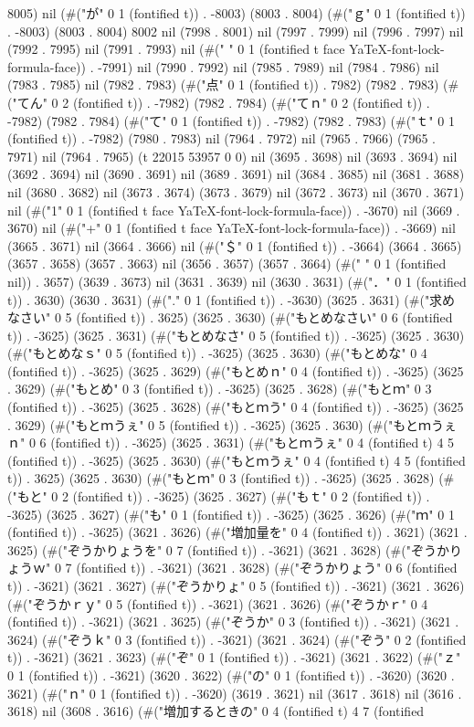 8005) nil (#("が" 0 1 (fontified t)) . -8003) (8003 . 8004) (#("ｇ" 0 1 (fontified t)) . -8003) (8003 . 8004) 8002 nil (7998 . 8001) nil (7997 . 7999) nil (7996 . 7997) nil (7992 . 7995) nil (7991 . 7993) nil (#(" " 0 1 (fontified t face YaTeX-font-lock-formula-face)) . -7991) nil (7990 . 7992) nil (7985 . 7989) nil (7984 . 7986) nil (7983 . 7985) nil (7982 . 7983) (#("点" 0 1 (fontified t)) . 7982) (7982 . 7983) (#("てん" 0 2 (fontified t)) . -7982) (7982 . 7984) (#("てｎ" 0 2 (fontified t)) . -7982) (7982 . 7984) (#("て" 0 1 (fontified t)) . -7982) (7982 . 7983) (#("ｔ" 0 1 (fontified t)) . -7982) (7980 . 7983) nil (7964 . 7972) nil (7965 . 7966) (7965 . 7971) nil (7964 . 7965) (t 22015 53957 0 0) nil (3695 . 3698) nil (3693 . 3694) nil (3692 . 3694) nil (3690 . 3691) nil (3689 . 3691) nil (3684 . 3685) nil (3681 . 3688) nil (3680 . 3682) nil (3673 . 3674) (3673 . 3679) nil (3672 . 3673) nil (3670 . 3671) nil (#("1" 0 1 (fontified t face YaTeX-font-lock-formula-face)) . -3670) nil (3669 . 3670) nil (#("+" 0 1 (fontified t face YaTeX-font-lock-formula-face)) . -3669) nil (3665 . 3671) nil (3664 . 3666) nil (#("＄" 0 1 (fontified t)) . -3664) (3664 . 3665) (3657 . 3658) (3657 . 3663) nil (3656 . 3657) (3657 . 3664) (#("	" 0 1 (fontified nil)) . 3657) (3639 . 3673) nil (3631 . 3639) nil (3630 . 3631) (#("．" 0 1 (fontified t)) . 3630) (3630 . 3631) (#("." 0 1 (fontified t)) . -3630) (3625 . 3631) (#("求めなさい" 0 5 (fontified t)) . 3625) (3625 . 3630) (#("もとめなさい" 0 6 (fontified t)) . -3625) (3625 . 3631) (#("もとめなさ" 0 5 (fontified t)) . -3625) (3625 . 3630) (#("もとめなｓ" 0 5 (fontified t)) . -3625) (3625 . 3630) (#("もとめな" 0 4 (fontified t)) . -3625) (3625 . 3629) (#("もとめｎ" 0 4 (fontified t)) . -3625) (3625 . 3629) (#("もとめ" 0 3 (fontified t)) . -3625) (3625 . 3628) (#("もとｍ" 0 3 (fontified t)) . -3625) (3625 . 3628) (#("もとｍう" 0 4 (fontified t)) . -3625) (3625 . 3629) (#("もとｍうぇ" 0 5 (fontified t)) . -3625) (3625 . 3630) (#("もとｍうぇｎ" 0 6 (fontified t)) . -3625) (3625 . 3631) (#("もとｍうぇ" 0 4 (fontified t) 4 5 (fontified t)) . -3625) (3625 . 3630) (#("もとｍうぇ" 0 4 (fontified t) 4 5 (fontified t)) . 3625) (3625 . 3630) (#("もとｍ" 0 3 (fontified t)) . -3625) (3625 . 3628) (#("もと" 0 2 (fontified t)) . -3625) (3625 . 3627) (#("もｔ" 0 2 (fontified t)) . -3625) (3625 . 3627) (#("も" 0 1 (fontified t)) . -3625) (3625 . 3626) (#("ｍ" 0 1 (fontified t)) . -3625) (3621 . 3626) (#("増加量を" 0 4 (fontified t)) . 3621) (3621 . 3625) (#("ぞうかりょうを" 0 7 (fontified t)) . -3621) (3621 . 3628) (#("ぞうかりょうｗ" 0 7 (fontified t)) . -3621) (3621 . 3628) (#("ぞうかりょう" 0 6 (fontified t)) . -3621) (3621 . 3627) (#("ぞうかりょ" 0 5 (fontified t)) . -3621) (3621 . 3626) (#("ぞうかｒｙ" 0 5 (fontified t)) . -3621) (3621 . 3626) (#("ぞうかｒ" 0 4 (fontified t)) . -3621) (3621 . 3625) (#("ぞうか" 0 3 (fontified t)) . -3621) (3621 . 3624) (#("ぞうｋ" 0 3 (fontified t)) . -3621) (3621 . 3624) (#("ぞう" 0 2 (fontified t)) . -3621) (3621 . 3623) (#("ぞ" 0 1 (fontified t)) . -3621) (3621 . 3622) (#("ｚ" 0 1 (fontified t)) . -3621) (3620 . 3622) (#("の" 0 1 (fontified t)) . -3620) (3620 . 3621) (#("ｎ" 0 1 (fontified t)) . -3620) (3619 . 3621) nil (3617 . 3618) nil (3616 . 3618) nil (3608 . 3616) (#("増加するときの" 0 4 (fontified t) 4 7 (fontified 